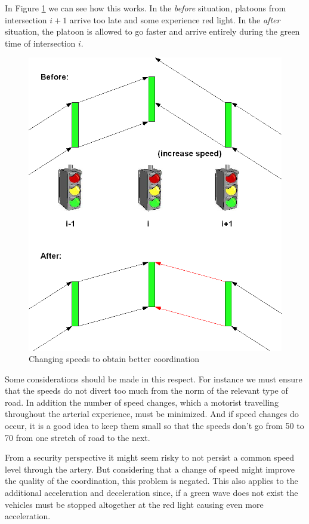 In Figure \ref{fig:change_speed} we can see how this works. In the \textit{before} situation, platoons from intersection $i+1$ arrive too late and some experience red light. In the \textit{after} situation, the platoon is allowed to go faster and arrive entirely during the green time of intersection $i$.

\begin{figure}[htbp]
\centering
\includegraphics[scale=0.3]{change_speed.png}
\caption{Changing speeds to obtain better coordination}
\label{fig:change_speed}
\end{figure}

Some considerations should be made in this respect. For instance we must ensure that the speeds do not divert too much from the norm of the relevant type of road. In addition the number of speed changes, which a motorist travelling throughout the arterial experience, must be minimized. And if speed changes do occur, it is a good idea to keep them small so that the speeds don't go from 50 to 70 from one stretch of road to the next.

From a security perspective it might seem risky to not persist a common speed level through the artery. But considering that a change of speed might improve the quality of the coordination, this problem is negated. This also applies to the additional acceleration and deceleration since, if a green wave does not exist the vehicles must be stopped altogether at the red light causing even more acceleration.

